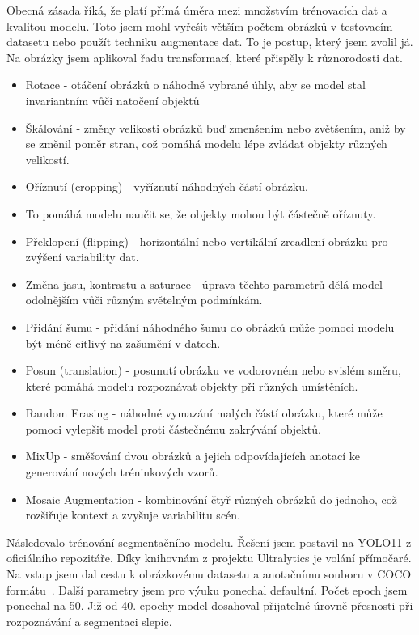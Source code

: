 Obecná zásada říká, že platí přímá úměra mezi množstvím trénovacích dat a kvalitou modelu.
Toto jsem mohl vyřešit větším počtem obrázků v testovacím datasetu nebo použít techniku augmentace dat.
To je postup, který jsem zvolil já. Na obrázky jsem aplikoval řadu transformací, které přispěly k různorodosti dat.

\begin{itemize}
    \item Rotace - otáčení obrázků o náhodně vybrané úhly, aby se model stal invariantním vůči natočení objektů
    \item Škálování - změny velikosti obrázků buď zmenšením nebo zvětšením, aniž by se změnil poměr stran, což pomáhá modelu lépe zvládat objekty různých velikostí.
    \item Oříznutí (cropping) - vyříznutí náhodných částí obrázku.
    \item To pomáhá modelu naučit se, že objekty mohou být částečně oříznuty.
    \item Překlopení (flipping) - horizontální nebo vertikální zrcadlení obrázku pro zvýšení variability dat.
    \item Změna jasu, kontrastu a saturace - úprava těchto parametrů dělá model odolnějším vůči různým světelným podmínkám.
    \item Přidání šumu - přidání náhodného šumu do obrázků může pomoci modelu být méně citlivý na zašumění v datech.
    \item Posun (translation) - posunutí obrázku ve vodorovném nebo svislém směru, které pomáhá modelu rozpoznávat objekty při různých umístěních.
    \item Random Erasing - náhodné vymazání malých částí obrázku, které může pomoci vylepšit model proti částečnému zakrývání objektů.
    \item MixUp - směšování dvou obrázků a jejich odpovídajících anotací ke generování nových tréninkových vzorů.
    \item Mosaic Augmentation - kombinování čtyř různých obrázků do jednoho, což rozšiřuje kontext a zvyšuje variabilitu scén.
\end{itemize}

Následovalo trénování segmentačního modelu.
Řešení jsem postavil na YOLO11 z oficiálního repozitáře.
Díky knihovnám z projektu Ultralytics je volání přímočaré.
Na vstup jsem dal cestu k obrázkovému datasetu a anotačnímu souboru v COCO formátu~\cite{COCOFormat}.
Další parametry jsem pro výuku ponechal defaultní.
Počet epoch jsem ponechal na 50.
Již od 40. epochy model dosahoval přijatelné úrovně přesnosti při rozpoznávání a segmentaci slepic.

